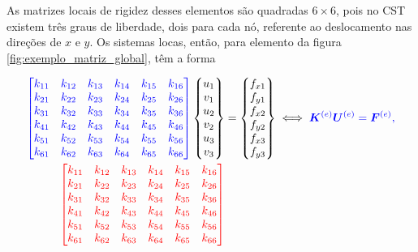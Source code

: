 As matrizes locais de rigidez desses elementos são quadradas $6 \times 6$, pois no CST existem três graus de liberdade, dois para cada nó, referente ao deslocamento nas direções de $x$ e $y$. Os sistemas locas, então, para elemento da figura \ref{fig:exemplo_matriz_global}, têm a forma

\begin{align}
    \color{blue} \begin{bmatrix}
        k_{11} & k_{12} & k_{13} & k_{14} & k_{15} & k_{16} \\
        k_{21} & k_{22} & k_{23} & k_{24} & k_{25} & k_{26} \\
        k_{31} & k_{32} & k_{33} & k_{34} & k_{35} & k_{36} \\
        k_{41} & k_{42} & k_{43} & k_{44} & k_{45} & k_{46} \\
        k_{51} & k_{52} & k_{53} & k_{54} & k_{55} & k_{56} \\
        k_{61} & k_{62} & k_{63} & k_{64} & k_{65} & k_{66} \\
    \end{bmatrix}
    \color{black}
    \begin{Bmatrix}
        u_1 \\ v_1 \\ u_2 \\ v_2 \\ u_3 \\ v_3
    \end{Bmatrix}
    &=
    \begin{Bmatrix}
        f_{x1} \\ f_{y1} \\ f_{x2} \\ f_{y2} \\ f_{x3} \\ f_{y3}
    \end{Bmatrix} \iff \color{blue} \bm{K}^{(e)} \bm{U}^{(e)} = \bm{F}^{(e)}, \\
    \color{red} \begin{bmatrix}
        k_{11} & k_{12} & k_{13} & k_{14} & k_{15} & k_{16} \\
        k_{21} & k_{22} & k_{23} & k_{24} & k_{25} & k_{26} \\
        k_{31} & k_{32} & k_{33} & k_{34} & k_{35} & k_{36} \\
        k_{41} & k_{42} & k_{43} & k_{44} & k_{45} & k_{46} \\
        k_{51} & k_{52} & k_{53} & k_{54} & k_{55} & k_{56} \\
        k_{61} & k_{62} & k_{63} & k_{64} & k_{65} & k_{66} \\

\end{bmatrix}
\end{align}
